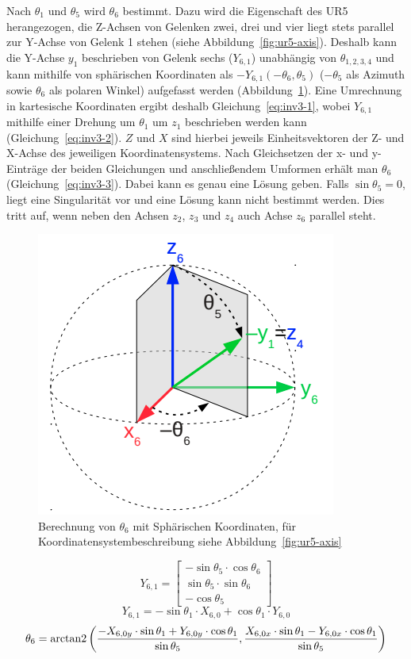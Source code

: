 Nach $\theta_1$ und $\theta_5$ wird $\theta_6$ bestimmt.
Dazu wird die Eigenschaft des UR5 herangezogen, die Z-Achsen von Gelenken zwei, drei und vier liegt stets parallel zur Y-Achse von Gelenk 1 stehen (siehe Abbildung~\ref{fig:ur5-axis}).
Deshalb kann die Y-Achse $y_1$ beschrieben von Gelenk sechs ($Y_{6,1}$) unabhängig von $\theta_{1,2,3,4}$ und kann mithilfe von sphärischen Koordinaten als $-Y_{6,1}(-\theta_6,\theta_5)$ ($-\theta_5$ als Azimuth sowie $\theta_6$ als polaren Winkel) aufgefasst werden (Abbildung~\ref{fig:inv1-3}).
Eine Umrechnung in kartesische Koordinaten ergibt deshalb Gleichung~\ref{eq:inv3-1}, wobei $Y_{6,1}$ mithilfe einer Drehung um $\theta_1$ um $z_1$ beschrieben werden kann (Gleichung~\ref{eq:inv3-2}).
$Z$ und $X$ sind hierbei jeweils Einheitsvektoren der Z- und X-Achse des jeweiligen Koordinatensystems.
Nach Gleichsetzen der x- und y-Einträge der beiden Gleichungen und anschließendem Umformen erhält man $\theta_6$ (Gleichung~\ref{eq:inv3-3}).
Dabei kann es genau eine Lösung geben.
Falls $\sin\theta_5=0$, liegt eine Singularität vor und eine Lösung kann nicht bestimmt werden.
Dies tritt auf, wenn neben den Achsen $z_2$, $z_3$ und $z_4$ auch Achse $z_6$ parallel steht.
\begin{figure}[h]
    \centering
    \includegraphics[width = .4\textwidth]{Bilder/inv3}
    \caption{Berechnung von $\theta_6$ mit Sphärischen Koordinaten, für Koordinatensystembeschreibung siehe Abbildung~\ref{fig:ur5-axis}}\label{fig:inv1-3}
\end{figure}
\begin{equation}
    Y_{6,1}=
    \begin{bmatrix}
        -\sin\theta_5 \cdot \cos\theta_6 \\ \sin\theta_5 \cdot\sin\theta_6 \\ -\cos\theta_5
    \end{bmatrix}
    \label{eq:inv3-1}
\end{equation}
\begin{equation}
    Y_{6,1}=
    -\sin\theta_1\cdot X_{6,0} + \cos\theta_1\cdot Y_{6,0}
    \label{eq:inv3-2}
\end{equation}
\begin{equation}
    \theta_6=
    \operatorname{arctan2}\left(
    \frac{
        -X_{6,0y} \cdot \sin\theta_1 + Y_{6,0y} \cdot \cos\theta_1
    }{
        \sin\theta_5
    },
    \frac{
        X_{6,0x} \cdot \sin\theta_1 - Y_{6,0x} \cdot \cos\theta_1
    }{
        \sin\theta_5
    }\right)
    \label{eq:inv3-3}
\end{equation}

